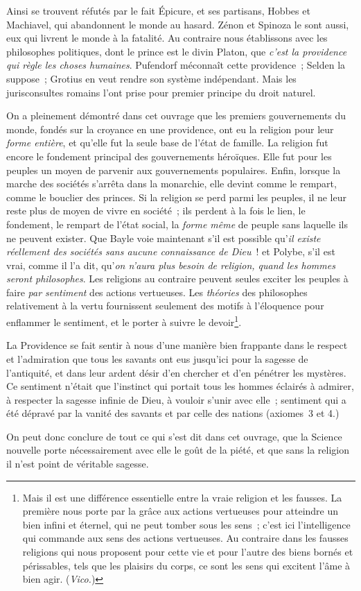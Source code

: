 \documentclass[french,twoside]{book} %
\newcommand\chapterclose{} %
\begin{document}
Ainsi se trouvent réfutés par le fait Épicure, et ses partisans, Hobbes et Machiavel, qui abandonnent le monde au hasard. Zénon et Spinoza le sont aussi, eux qui livrent le monde à la fatalité. Au contraire nous établissons avec les philosophes politiques, dont le prince est le divin Platon, que {\itshape c’est la providence qui règle les choses humaines}. Pufendorf méconnaît cette providence ; Selden la suppose ; Grotius en veut rendre son système indépendant. Mais les jurisconsultes romains l’ont prise pour premier principe du droit naturel.\par
On a pleinement démontré dans cet ouvrage que les premiers gouvernements du monde, fondés sur  la croyance en une providence, ont eu la religion pour leur {\itshape forme entière}, et qu’elle fut la seule base de l’état de famille. La religion fut encore le fondement principal des gouvernements héroïques. Elle fut pour les peuples un moyen de parvenir aux gouvernements populaires. Enfin, lorsque la marche des sociétés s’arrêta dans la monarchie, elle devint comme le rempart, comme le bouclier des princes. Si la religion se perd parmi les peuples, il ne leur reste plus de moyen de vivre en société ; ils perdent à la fois le lien, le fondement, le rempart de l’état social, la {\itshape forme même} de peuple sans laquelle ils ne peuvent exister. Que Bayle voie maintenant s’il est possible qu’{\itshape il existe réellement des sociétés sans aucune connaissance de Dieu} ! et Polybe, s’il est vrai, comme il l’a dit, qu’{\itshape on n’aura plus besoin de religion, quand les hommes seront philosophes}. Les religions au contraire peuvent seules exciter les peuples à faire {\itshape par sentiment} des actions vertueuses. Les {\itshape théories} des philosophes relativement à la vertu fournissent seulement des motifs à l’éloquence pour enflammer le sentiment, et le porter à suivre le devoir\footnote{Mais il est une différence essentielle entre la vraie religion et les fausses. La première nous porte par la grâce aux actions vertueuses pour atteindre un bien infini et éternel, qui ne peut tomber sous les sens ; c’est ici l’intelligence qui commande aux sens des actions vertueuses. Au contraire dans les fausses religions qui nous proposent pour cette vie et pour l’autre des biens bornés et périssables, tels que les plaisirs du corps, ce sont les sens qui excitent l’âme à bien agir. ({\itshape Vico.})}.\par
La Providence se fait sentir à nous d’une manière  bien frappante dans le respect et l’admiration que tous les savants ont eus jusqu’ici pour la sagesse de l’antiquité, et dans leur ardent désir d’en chercher et d’en pénétrer les mystères. Ce sentiment n’était que l’instinct qui portait tous les hommes éclairés à admirer, à respecter la sagesse infinie de Dieu, à vouloir s’unir avec elle ; sentiment qui a été dépravé par la vanité des savants et par celle des nations (axiomes 3 et 4.)\par
On peut donc conclure de tout ce qui s’est dit dans cet ouvrage, que la Science nouvelle porte nécessairement avec elle le goût de la piété, et que sans la religion il n’est point de véritable sagesse.
\chapterclose
\end{document}
